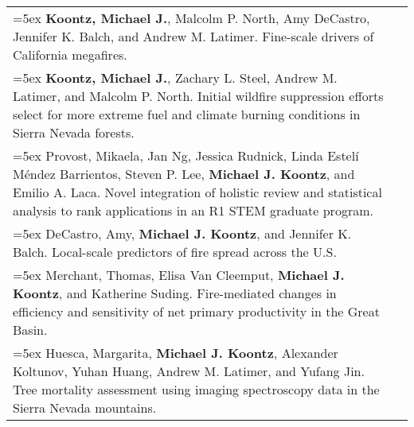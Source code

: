 \begin{longtable}{@{} >{\raggedright}p{5.25in} >{\raggedleft}X @{}}

\hangindent=5ex \textbf{Koontz, Michael J.}, Malcolm P. North, Amy DeCastro, Jennifer K. Balch, and Andrew M. Latimer. Fine-scale drivers of California megafires.  & [\textcolor{blue}{\href{https://github.com/mikoontz/megafire-fine-scale-drivers}{GitHub}}] \tabularnewline

\hangindent=5ex \textbf{Koontz, Michael J.}, Zachary L. Steel, Andrew M. Latimer, and Malcolm P. North. Initial wildfire suppression efforts select for more extreme fuel and climate burning conditions in Sierra Nevada forests.  & [\textcolor{blue}{\href{https://github.com/mikoontz/selection-by-suppression}{GitHub}}] \tabularnewline

\hangindent=5ex Provost, Mikaela, Jan Ng, Jessica Rudnick, Linda Estel\'i M\'endez Barrientos, Steven P. Lee, \textbf{Michael J. Koontz}, and Emilio A. Laca. Novel integration of holistic review and statistical analysis to rank applications in an R1 STEM graduate program. & \tabularnewline

\hangindent=5ex DeCastro, Amy, \textbf{Michael J. Koontz}, and Jennifer K. Balch. Local-scale predictors of fire spread across the U.S. & \tabularnewline

\hangindent=5ex Merchant, Thomas, Elisa Van Cleemput, \textbf{Michael J. Koontz}, and Katherine Suding. Fire-mediated changes in efficiency and sensitivity of net primary productivity in the Great Basin. & \tabularnewline

\hangindent=5ex Huesca, Margarita, \textbf{Michael J. Koontz}, Alexander Koltunov, Yuhan Huang, Andrew M. Latimer, and Yufang Jin. Tree mortality assessment using imaging spectroscopy data in the Sierra Nevada mountains. & \tabularnewline


\end{longtable}




